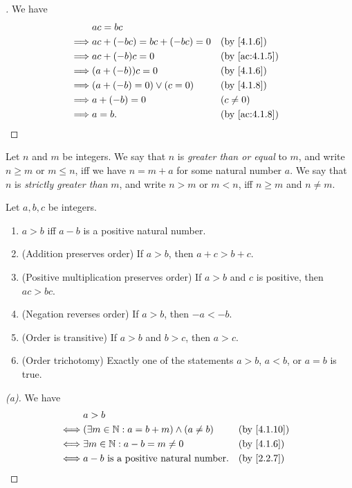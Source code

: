 \begin{proof}[]
  We have
  \begin{align*}
             & ac = bc                                        \\
    \implies & ac + (-bc) = bc + (-bc) = 0 &  & \by{4.1.6}    \\
    \implies & ac + (-b) c = 0             &  & \by{ac:4.1.5} \\
    \implies & (a + (-b)) c = 0            &  & \by{4.1.6}    \\
    \implies & (a + (-b) = 0) \lor (c = 0) &  & \by{4.1.8}    \\
    \implies & a + (-b) = 0                &  & (c \neq 0)    \\
    \implies & a = b.                      &  & \by{ac:4.1.8}
  \end{align*}
\end{proof}

\begin{defn}\label{4.1.10}
  Let \(n\) and \(m\) be integers.
  We say that \(n\) is \emph{greater than or equal} to \(m\), and write \(n \geq m\) or \(m \leq n\), iff we have \(n = m + a\) for some natural number \(a\).
  We say that \(n\) is \emph{strictly greater than} \(m\), and write \(n > m\) or \(m < n\), iff \(n \geq m\) and \(n \neq m\).
\end{defn}

\begin{lem}\label{4.1.11}
  Let \(a, b, c\) be integers.
  \begin{enumerate}
    \item \(a > b\) iff \(a - b\) is a positive natural number.
    \item (Addition preserves order) If \(a > b\), then \(a + c > b + c\).
    \item (Positive multiplication preserves order) If \(a > b\) and \(c\) is positive, then \(ac > bc\).
    \item (Negation reverses order) If \(a > b\), then \(-a < -b\).
    \item (Order is transitive) If \(a > b\) and \(b > c\), then \(a > c\).
    \item (Order trichotomy) Exactly one of the statements \(a > b\), \(a < b\), or \(a = b\) is true.
  \end{enumerate}
\end{lem}

\begin{proof}[(a)]
  We have
  \begin{align*}
         & a > b                                                            \\
    \iff & (\exists m \in \N : a = b + m) \land (a \neq b) &  & \by{4.1.10} \\
    \iff & \exists m \in \N : a - b = m \neq 0             &  & \by{4.1.6}  \\
    \iff & a - b \text{ is a positive natural number}.     &  & \by{2.2.7}
  \end{align*}
\end{proof}

